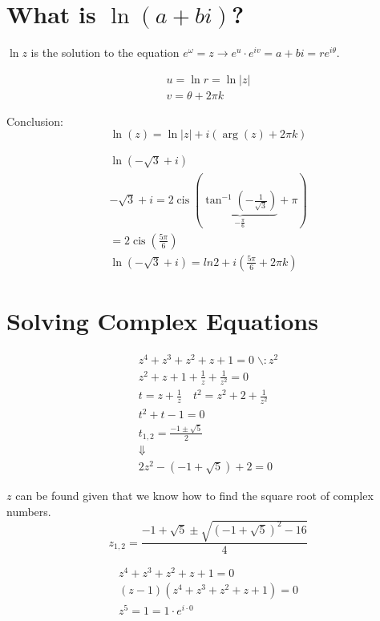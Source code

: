 \documentclass[00_complete]{subfiles}
\begin{document}
\section{\texorpdfstring{What is \(\ln(a+bi)\)?}{What is ln(a+bi)?}}

\(\ln z\) is the solution to the equation
\(e^\omega=z \to e^u \cdot e^{iv}=a+bi = re^{i\theta}\).

\[
\begin{gathered}
    u = \ln r = \ln|z| \\
    v= \theta +2\pi k
\end{gathered}
\]

Conclusion: \[
\ln(z) = \ln|z|+i(\arg(z)+2\pi k)
\]

\begin{example}
\[
\begin{gathered}
    \ln(- \sqrt 3 + i)\\
    -\sqrt 3 + i =2 \operatorname{cis}\left(\underbrace{\tan^{-1}\left(-\frac{1}{\sqrt 3}\right)}_{-\frac{\pi}{6}}+\pi\right) \\
    =2 \operatorname{cis}\left(\frac{5\pi}{6}\right) \\
    \ln(-\sqrt 3+i) = ln 2 + i \left(\frac{5\pi}{6} + 2 \pi k\right)
\end{gathered}
\]

\end{example}
\section{Solving Complex Equations}

\[
\begin{gathered}
    z^4+z^3+z^2+z +1 = 0 \;\backslash : z^2 \\
    z^2+z +1 + \frac{1}{z} + \frac{1}{z^2} = 0 \\
    t = z + \frac{1}{z} \quad t^2 = z^2 +2 + \frac{1}{z^2} \\
    t^2 + t - 1= 0 \\
    t_{1,2} = \frac{-1 \pm \sqrt 5}{2} \\
    \Downarrow \\
    2z^2 -(-1 + \sqrt 5) + 2 = 0
\end{gathered}
\]

\(z\) can be found given that we know how to find the square root of
complex numbers. \[
    z_{1,2} = \frac{-1 + \sqrt 5 \pm \sqrt{(-1+\sqrt 5)^2-16}}{4}
\]

\[
\begin{gathered}
z^4+z^3+z^2+z+1 = 0 \\
(z-1)(z^4+z^3+z^2+z+1)=0 \\
z^5 = 1 = \boxed{1 \cdot e^{i \cdot 0}}
\end{gathered}
\]
\end{document}
